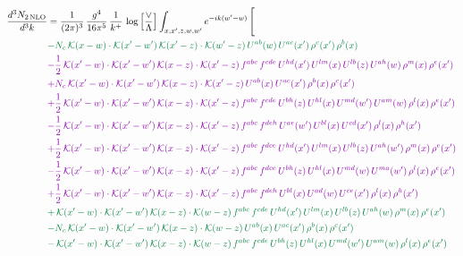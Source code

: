 \documentclass[10pt]{article}
\numberwithin{equation}{section}
\begin{document}
\begin{align}
\frac{d^{3}N_{2\,\mathrm{NLO}}}{d^{3}k} & = \frac{1}{(2\pi)^{3}}\,\frac{g^{4}}{16\pi^{5}}\,\frac{1}{k^{+}}\,\log\Big[\frac{\vee}{\Lambda}\Big]\int_{x,x',z,w,w'}e^{-ik(w'-w)}\,\Bigg[\notag\\ &{\color{JIM} -N_{c}\,\mathcal{K}(x-w)\cdot\mathcal{K}(x'-w')\,\mathcal{K}(x'-z)\cdot\mathcal{K}(w'-z)\,U^{ab}(w)\,U^{ac}(x')\,\rho^{c}(x')\,\rho^{b}(x)} \notag\\
&{\color{CC} -\frac{1}{2}\,\mathcal{K}(x'-w)\cdot\mathcal{K}(x'-w')\,\mathcal{K}(x-z)\cdot\mathcal{K}(x'-z)\,f^{abc}\,f^{cde}\,U^{hd}(x')\,U^{lm}(x)\,U^{lb}(z)\,U^{ah}(w)\,\rho^{m}(x)\,\rho^{e}(x')} \notag\\
&{\color{CC} +N_{c}\,\mathcal{K}(x'-w)\cdot\mathcal{K}(x'-w')\,\mathcal{K}(x-z)\cdot\mathcal{K}(x'-z)\,U^{ab}(x)\,U^{ac}(x')\,\rho^{b}(x)\,\rho^{c}(x')} \notag\\
&{\color{CC} +\frac{1}{2}\,\mathcal{K}(x'-w)\cdot\mathcal{K}(x'-w')\,\mathcal{K}(x-z)\cdot\mathcal{K}(x'-z)\,f^{abc}\,f^{cde}\,U^{bh}(z)\,U^{hl}(x)\,U^{md}(w')\,U^{am}(w)\,\rho^{l}(x)\,\rho^{e}(x')} \notag\\
&{\color{CC} -\frac{1}{2}\,\mathcal{K}(x'-w)\cdot\mathcal{K}(x'-w')\,\mathcal{K}(x-z)\cdot\mathcal{K}(x'-z)\,f^{abc}\,f^{deh}\,U^{ae}(w')\,U^{bl}(x)\,U^{cd}(x')\,\rho^{l}(x)\,\rho^{h}(x')} \notag \\ &{\color{CC} +\frac{1}{2}\,\mathcal{K}(x'-w)\cdot\mathcal{K}(x'-w')\,\mathcal{K}(x-z)\cdot\mathcal{K}(x'-z)\,f^{abc}\,f^{dce}\,U^{hd}(x')\,U^{lm}(x)\,U^{lb}(z)\,U^{ah}(w')\,\rho^{m}(x)\,\rho^{e}(x')} \notag\\
&{\color{CC} -\frac{1}{2}\,\mathcal{K}(x'-w)\cdot\mathcal{K}(x'-w')\,\mathcal{K}(x-z)\cdot\mathcal{K}(x'-z)\,f^{abc}\,f^{dce}\,U^{bh}(z)\,U^{hl}(x)\,U^{md}(w)\,U^{ma}(w')\,\rho^{l}(x)\,\rho^{e}(x')} \notag\\
&{\color{CC} +\frac{1}{2}\,\mathcal{K}(x'-w)\cdot\mathcal{K}(x'-w')\,\mathcal{K}(x-z)\cdot\mathcal{K}(x'-z)\,f^{abc}\,f^{deh}\,U^{bl}(x)\,U^{ad}(w)\,U^{ce}(x')\,\rho^{l}(x)\,\rho^{h}(x')} \notag\\
&{\color{JIM} +\,\mathcal{K}(x'-w)\cdot\mathcal{K}(x'-w')\,\mathcal{K}(x-z)\cdot\mathcal{K}(w-z)\,f^{abc}\,f^{cde}\,U^{hd}(x')\,U^{lm}(x)\,U^{lb}(z)\,U^{ah}(w)\,\rho^{m}(x)\,\rho^{e}(x')} \notag\\
&{\color{JIM} -N_{c}\,\mathcal{K}(x'-w)\cdot\mathcal{K}(x'-w')\,\mathcal{K}(x-z)\cdot\mathcal{K}(w-z)\,U^{ab}(x)\,U^{ac}(x')\,\rho^{b}(x)\,\rho^{c}(x')} \notag\\
&{\color{JIM} -\,\mathcal{K}(x'-w)\cdot\mathcal{K}(x'-w')\,\mathcal{K}(x-z)\cdot\mathcal{K}(w-z)\,f^{abc}\,f^{cde}\,U^{bh}(z)\,U^{hl}(x)\,U^{md}(w')\,U^{am}(w)\,\rho^{l}(x)\,\rho^{e}(x')} \notag\\

\end{align}
\end{document}
